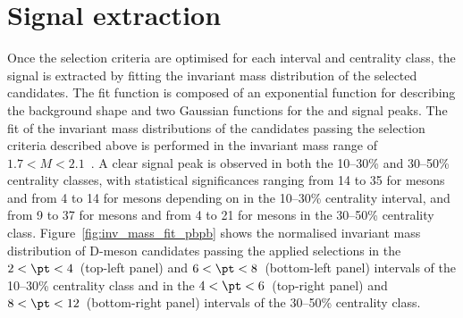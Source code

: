 \section{Signal extraction}
Once the selection criteria are optimised for each \pt interval and centrality class, the signal is extracted by fitting the invariant mass distribution of the selected candidates. The fit function is composed of an exponential function for describing the background shape and two Gaussian functions for the \ds and \dpl signal peaks. The fit of the invariant mass distributions of the candidates passing the selection criteria described above is performed in the invariant mass range of $1.7 < M < 2.1$~\gevcc. A clear signal peak is observed in both the 10--30\% and 30--50\% centrality classes, with statistical significances ranging from 14 to 35 for \ds mesons and from 4 to 14 for \dpl mesons depending on \pt in the 10--30\% centrality interval, and from 9 to 37 for \ds mesons and from 4 to 21 for \dpl mesons in the 30--50\% centrality class. Figure~\ref{fig:inv_mass_fit_pbpb} shows the normalised invariant mass distribution of D-meson candidates passing the applied selections in the $2<\pt<4$~\gevc (top-left panel) and $6<\pt<8$~\gevc (bottom-left panel) intervals of the 10--30\% centrality class and in the $4<\pt<6$~\gevc (top-right panel) and $8<\pt<12$~\gevc (bottom-right panel) intervals of the 30--50\% centrality class. 

